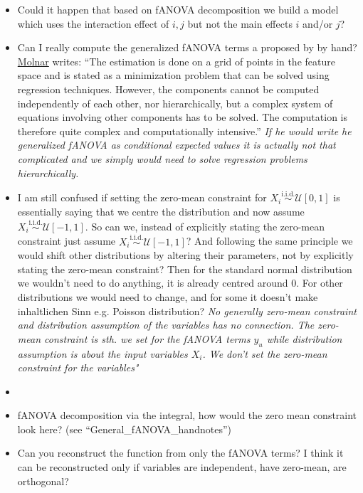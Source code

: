 \begin{itemize}
    \item Could it happen that based on fANOVA decomposition we build a model which uses the interaction effect of $i,j$ but not the main effects $i$ and/or $j$? 
    \item Can I really compute the generalized fANOVA terms a proposed by \cite{hooker2007} by hand? \href{https://christophm.github.io/interpretable-ml-book/decomposition.html}{Molnar} writes: ``The estimation is done on a grid of points in the feature space and is stated as a minimization problem that can be solved using regression techniques. However, the components cannot be computed independently of each other, nor hierarchically, but a complex system of equations involving other components has to be solved. The computation is therefore quite complex and computationally intensive.'' \textit{If he would write he generalized fANOVA as conditional expected values it is actually not that complicated and we simply would need to solve regression problems hierarchically.}
    \item I am still confused if setting the zero-mean constraint for $X_i \overset{\text{i.i.d.}}{\sim} \mathcal{U}[0, 1]$ is essentially saying that we centre the distribution and now assume $X_i \overset{\text{i.i.d.}}{\sim} \mathcal{U}[-1, 1]$. So can we, instead of explicitly stating the zero-mean constraint just assume $X_i \overset{\text{i.i.d.}}{\sim} \mathcal{U}[-1, 1]$? And following the same principle we would shift other distributions by altering their parameters, not by explicitly stating the zero-mean constraint? Then for the standard normal distribution we wouldn't need to do anything, it is already centred around 0. For other distributions we would need to change, and for some it doesn't make inhaltlichen Sinn e.g. Poisson distribution? \textit{No generally zero-mean constraint and distribution assumption of the variables has no connection. The zero-mean constraint is sth. we set for the fANOVA terms $y_u$ while distribution assumption is about the input variables $X_i$. We don't set the zero-mean constraint for the variables"}
    \item 
    \item fANOVA decomposition via the integral, how would the zero mean constraint look here? (see ``General\_fANOVA\_handnotes'')
    \item Can you reconstruct the function from only the fANOVA terms? I think it can be reconstructed only if variables are independent, have zero-mean, are orthogonal?

\end{itemize}
